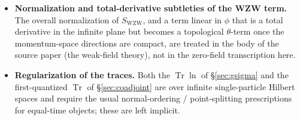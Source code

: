 \documentclass[11pt]{article}
\theoremstyle{remark}
\begin{document}
\begin{itemize}
Landau-level degeneracy.
\item \textbf{Normalization and total-derivative subtleties of the WZW term.} The
overall normalization of $S_{\mathrm{WZW}}$, and a term linear in $\phi$ that is a
total derivative in the infinite plane but becomes a topological $\theta$-term once
the momentum-space directions are compact, are treated in the body of the source
paper (the weak-field theory), not in the zero-field transcription here.
\item \textbf{Regularization of the traces.} Both the $\operatorname{Tr}\ln$ of
\S\ref{sec:gsigma} and the first-quantized $\operatorname{Tr}$ of \S\ref{sec:coadjoint} are over
infinite single-particle Hilbert spaces and require the usual normal-ordering /
point-splitting prescriptions for equal-time objects; these are left implicit.
\end{itemize}
\end{document}

